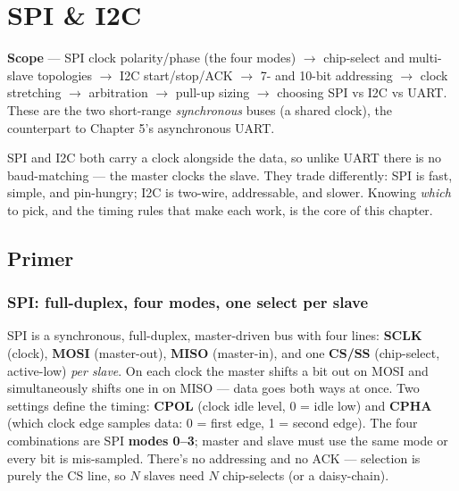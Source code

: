 
\chapter{SPI \& I2C}
\label{ch:spi-i2c}

\begin{partnote}
\textbf{Scope} --- SPI clock polarity/phase (the four modes) $\rightarrow$
chip-select and multi-slave topologies $\rightarrow$ I2C start/stop/ACK
$\rightarrow$ 7- and 10-bit addressing $\rightarrow$ clock stretching
$\rightarrow$ arbitration $\rightarrow$ pull-up sizing $\rightarrow$ choosing
SPI vs I2C vs UART. These are the two short-range \emph{synchronous} buses
(a shared clock), the counterpart to Chapter 5's asynchronous UART.
\end{partnote}

SPI and I2C both carry a clock alongside the data, so unlike UART there is no
baud-matching --- the master clocks the slave. They trade differently: SPI is
fast, simple, and pin-hungry; I2C is two-wire, addressable, and slower. Knowing
\emph{which} to pick, and the timing rules that make each work, is the core of
this chapter.

\section{Primer}

\subsection{SPI: full-duplex, four modes, one select per slave}

SPI is a synchronous, full-duplex, master-driven bus with four lines:
\textbf{SCLK} (clock), \textbf{MOSI} (master-out), \textbf{MISO} (master-in),
and one \textbf{CS/SS} (chip-select, active-low) \emph{per slave}. On each clock
the master shifts a bit out on MOSI and simultaneously shifts one in on MISO ---
data goes both ways at once. Two settings define the timing: \textbf{CPOL}
(clock idle level, 0 = idle low) and \textbf{CPHA} (which clock edge samples
data: 0 = first edge, 1 = second edge). The four combinations are SPI
\textbf{modes 0--3}; master and slave must use the same mode or every bit is
mis-sampled. There's no addressing and no ACK --- selection is purely the CS
line, so $N$ slaves need $N$ chip-selects (or a daisy-chain).

